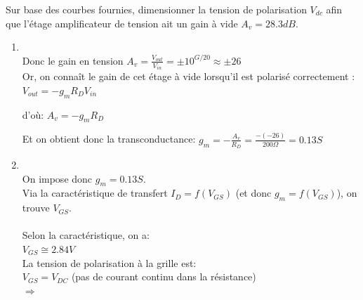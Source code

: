 \Question
{
Sur base des courbes fournies, dimensionner la tension de polarisation $V_{dc}$ afin que l'étage amplificateur de tension ait un gain à vide $A_v=28.3dB$. 

}
{%
\begin{enumerate}

	
	\item {}\\
	
	Donc le gain en tension $A_v=\frac{V_{out}}{V_{in}}=\pm 10^{G/20}\approx \pm26$\\
	
	Or, on connaît le gain de cet étage à vide lorsqu'il est polarisé correctement :
	$V_{out}=-g_m R_D V_{in}$ 	
	
	d'où:	$A_v=-g_m R_D$
	
	Et on obtient donc la transconductance:
	$g_m=-\frac{A_v}{R_D}=\frac{-(-26)}{200\Omega}=0.13 S$
	
	\item {}\\
	
	On impose donc $g_m=0.13S$.\\
	Via la caractéristique de transfert $I_D=f(V_{GS})$ (et donc $g_m=f(V_{GS})$), on trouve $V_{GS}$.\\
	~\\
Selon la caractéristique, on a:\\
	$V_{GS}\cong 2.84V$\\
		
La tension de polarisation à la grille est:\\
	$V_{GS}=V_{DC}$ (pas de courant continu dans la résistance)\\
	
%	
%	
	$\Rightarrow$ 
	
\end{enumerate}
}

